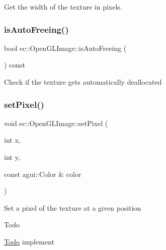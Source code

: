 Get the width of the texture in pixels. \mbox{\label{classec_1_1_open_g_l_image_a5d441f3a70726dcf21ab70e2edbbdf9d}} 
\subsubsection{\texorpdfstring{is\+Auto\+Freeing()}{isAutoFreeing()}}
{\footnotesize\ttfamily bool ec\+::\+Open\+G\+L\+Image\+::is\+Auto\+Freeing (\begin{DoxyParamCaption}{ }\end{DoxyParamCaption}) const\hspace{0.3cm}{\ttfamily [override]}}

Check if the texture gets automatically deallocated \mbox{\label{classec_1_1_open_g_l_image_a0f10c45c14e5092b1b7b5a57d09f2682}} 
\subsubsection{\texorpdfstring{set\+Pixel()}{setPixel()}}
{\footnotesize\ttfamily void ec\+::\+Open\+G\+L\+Image\+::set\+Pixel (\begin{DoxyParamCaption}\item[{int}]{x,  }\item[{int}]{y,  }\item[{const agui\+::\+Color \&}]{color }\end{DoxyParamCaption})\hspace{0.3cm}{\ttfamily [override]}}

Set a pixel of the texture at a given position \begin{DoxyRefDesc}{Todo}
\item[\mbox{\hyperlink{todo__todo000016}{Todo}}]implement \end{DoxyRefDesc}
\mbox{\label{classec_1_1_open_g_l_image_ac2ac8ff7716843a697e269e172788961}} 
